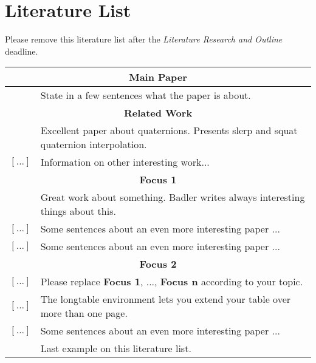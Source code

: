 \chapter*{Literature List}

Please remove this literature list after the \textit{Literature Research and Outline} deadline. 

\begin{longtable}{|p{5cm} | p{9cm}|}
	\hline
	\multicolumn{2}{|c|}{\textbf{Main Paper}} \\ \hline
	\cite{Hanzo2004} & State in a few sentences what the paper is about. \\ \hline
	\multicolumn{2}{|c|}{\textbf{Related Work}} \\ \hline
	\cite{Dam1998} & Excellent paper about quaternions. Presents slerp and squat quaternion interpolation. \\ \hline	
	 $\left[...\right]$ & Information on other interesting work... \\ \hline
	\multicolumn{2}{|c|}{\textbf{Focus 1}} \\ \hline
	\cite{Badler1994} & Great work about something. Badler writes always interesting things about this. \\ \hline
	  $\left[...\right]$& Some sentences about an even more interesting paper ... \\ \hline
	 $\left[...\right]$& Some sentences about an even more interesting paper ... \\ \hline
	\multicolumn{2}{|c|}{\textbf{Focus 2}} \\ \hline
	  $\left[...\right]$& Please replace \textbf{Focus 1}, ..., \textbf{Focus n} according to your topic.  \\  \hline
	  $\left[...\right]$& The longtable environment lets you extend your table over more than one page.\\ \hline
	  $\left[...\right]$& Some sentences about an even more interesting paper ... \\ \hline
 	\cite{Fowler2000} & Last example on this literature list. \\
	 \hline
\end{longtable}
